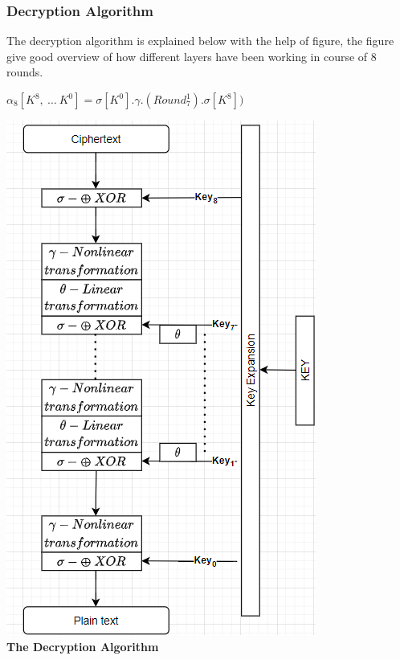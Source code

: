 \documentclass[preprint]{transcrypto}
\begin{document}
\subsubsection{Decryption Algorithm}
The decryption algorithm is explained below with the help of figure, the figure give good overview of how different layers have been working in course of 8 rounds.  \\
\begin{center}
    \textbf{$ \alpha_{8}[K^8, \ \dots \ K^0] = \sigma[K^0].\gamma.\left(Round_{7}^{1}\right).\sigma[K^8])$}
\end{center}
\begin{center}
    \includegraphics[scale=1]{Screenshots/decrypt.png} \\ 
        \textbf{The Decryption Algorithm}
\end{center}
\newpage
\end{document}
